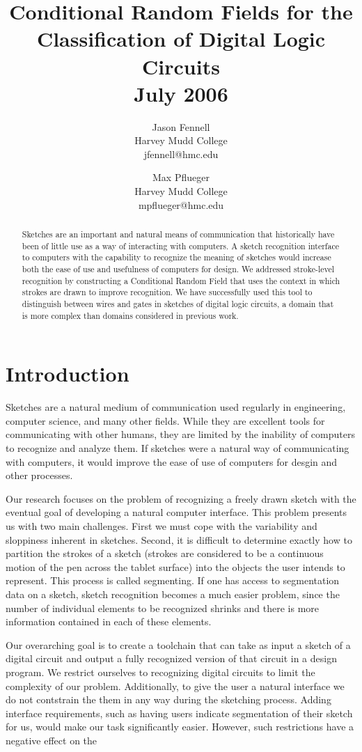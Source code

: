 \documentclass[10pt]{acmsiggraph}               %
\title{Conditional Random Fields for the Classification of Digital Logic Circuits\\
\small{July 2006}}
\author{Jason Fennell\\ Harvey Mudd College \\ jfennell@hmc.edu
\and Max Pflueger\\ Harvey Mudd College \\ mpflueger@hmc.edu }
\begin{document}
\maketitle

\begin{abstract}
Sketches are an important and natural means of communication that historically have been of little use as a way of interacting with computers.  A sketch recognition interface to computers with the capability to recognize the meaning of sketches would increase both the ease of use and usefulness of computers for design.  We addressed stroke-level recognition by constructing a Conditional Random Field that uses the context in which strokes are drawn to improve recognition.  We have successfully used this tool to distinguish between wires and gates in sketches of digital logic circuits, a domain that is more complex than domains considered in previous work.
\end{abstract}

\section{Introduction}

Sketches are a natural medium of communication used regularly in engineering, computer science, and many other fields.  While they are excellent tools for communicating with other humans, they are limited by the inability of computers to recognize and analyze them. If sketches were a natural way of communicating with computers, it would improve the ease of use of computers for desgin and other processes.

Our research focuses on the problem of recognizing a freely drawn sketch with the eventual goal of developing a natural computer interface.  This problem presents us with two main challenges. First we must cope with the variability and sloppiness inherent in sketches.  Second, it is difficult to determine exactly how to partition the strokes of a sketch (strokes are considered to be a continuous motion of the pen across the tablet surface) into the objects the user intends to represent. This process is called segmenting.  If one has access to segmentation data on a sketch, sketch recognition becomes a much easier problem, since the number of individual elements to be recognized shrinks and there is more information contained in each of these elements. 

Our overarching goal is to create a toolchain that can take as input a sketch of a digital circuit and output a fully recognized version of that circuit in a design program.  We restrict ourselves to recognizing digital circuits to limit the complexity of our problem.  Additionally, to give the user a natural interface we do not contstrain the them in any way during the sketching process.  Adding interface requirements, such as having users indicate segmentation of their sketch for us, would make our task significantly easier.  However, such restrictions have a negative effect on the
\end{document}
